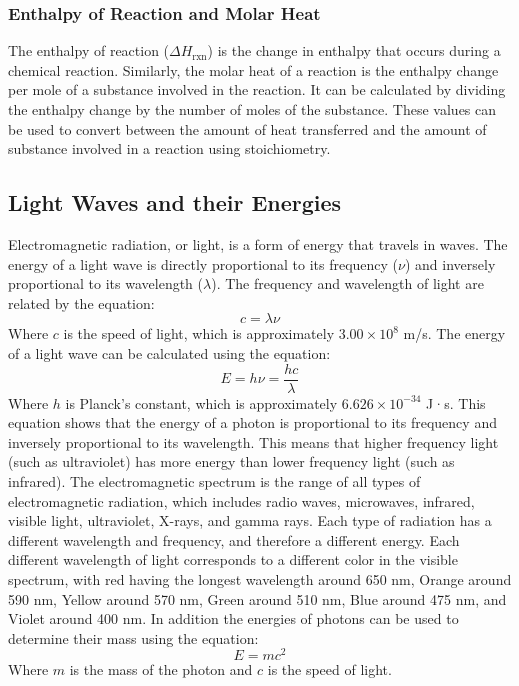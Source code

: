 \subsubsection{Enthalpy of Reaction and Molar Heat}
The enthalpy of reaction ($\Delta H_\text{rxn}$) is the change in enthalpy that occurs during a chemical reaction. Similarly, the molar heat of a reaction is the enthalpy change per mole of a substance involved in the reaction. It can be calculated by dividing the enthalpy change by the number of moles of the substance. These values can be used to convert between the amount of heat transferred and the amount of substance involved in a reaction using stoichiometry.

\subsection{Light Waves and their Energies}
Electromagnetic radiation, or light, is a form of energy that travels in waves. The energy of a light wave is directly proportional to its frequency ($\nu$) and inversely proportional to its wavelength ($\lambda$). The frequency and wavelength of light are related by the equation:
\begin{equation}\label{eq:light_speed}
    c = \lambda \nu
\end{equation}
Where $c$ is the speed of light, which is approximately $3.00 \times 10^8$ m/s. The energy of a light wave can be calculated using the equation:
\begin{equation}\label{eq:light_energy}
    E = h\nu = \frac{hc}{\lambda}
\end{equation}
Where $h$ is Planck's constant, which is approximately $6.626 \times 10^{-34}$ J·s. This equation shows that the energy of a photon is proportional to its frequency and inversely proportional to its wavelength. This means that higher frequency light (such as ultraviolet) has more energy than lower frequency light (such as infrared).
The electromagnetic spectrum is the range of all types of electromagnetic radiation, which includes radio waves, microwaves, infrared, visible light, ultraviolet, X-rays, and gamma rays. Each type of radiation has a different wavelength and frequency, and therefore a different energy. Each different wavelength of light corresponds to a different color in the visible spectrum, with red having the longest wavelength around 650 nm, Orange around 590 nm, Yellow around 570 nm, Green around 510 nm, Blue around 475 nm, and Violet around 400 nm. 
In addition the energies of photons can be used to determine their mass using the equation:
\begin{equation}\label{eq:massEnergy}
    E = mc^2
\end{equation}
Where $m$ is the mass of the photon and $c$ is the speed of light. 

